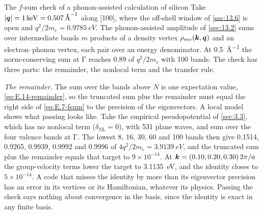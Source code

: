 \begin{workedexample}{The $f$-sum check of a phonon-assisted calculation of silicon}\label{we:22-fsum}
Take $|\bm{q}| = \SI{1}{keV} = \SI{0.507}{\angstrom^{-1}}$ along [100], where the off-shell window of \cref{sec:13.6} is open and $q^2/2m_e = \SI{0.9785}{eV}$. The phonon-assisted amplitude of \cref{sec:13.2} sums over intermediate bands $m$ products of a density vertex $\rho_{mv}(\bm{k},\bm{q})$ and an electron--phonon vertex, each pair over an energy denominator. At \SI{0.5}{\angstrom^{-1}} the norm-conserving sum at $\mathrm{\Gamma}$ reaches 0.89 of $q^2/2m_e$ with 100 bands. The check has three parts: the remainder, the nonlocal term and the transfer rule.

\emph{The remainder.} The sum over the bands above $N$ is one expectation value, \cref{eq:E.14-remainder}, so the truncated sum plus the remainder must equal the right side of \cref{eq:E.7-fsum} to the precision of the eigenvectors. A local model shows what passing looks like. Take the empirical pseudopotential of \cref{sec:3.3}, which has no nonlocal term ($\delta_{\mathrm{NL}} = 0$), with 531 plane waves, and sum over the four valence bands at $\mathrm{\Gamma}$. The lowest 8, 16, 30, 60 and 100 bands then give 0.1514, 0.9265, 0.9939, 0.9992 and 0.9996 of $4q^2/2m_e = \SI{3.9139}{eV}$, and the truncated sum plus the remainder equals that target to $9\times10^{-14}$. At $\bm{k} = (0.10, 0.20, 0.30)\,2\pi/a$ the group-velocity terms lower the target to \SI{3.1135}{eV}, and the identity closes to $5\times10^{-14}$. A code that misses the identity by more than its eigenvector precision has an error in its vertices or its Hamiltonian, whatever its physics. Passing the check says nothing about convergence in the basis, since the identity is exact in any finite basis.


\end{workedexample}
